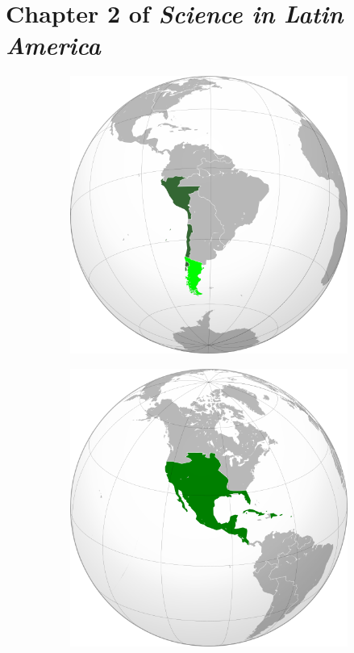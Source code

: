 \documentclass[12pt]{article}
\begin{document}
\maketitle

\section{Chapter 2 of \textit{Science in Latin America}}

\begin{figure}[ht]
\centering
\begin{subfigure}{0.15\textwidth}
\includegraphics[width=\textwidth]{vice_peru.png}
\caption{\label{fig:1a}}
\end{subfigure}
\begin{subfigure}{0.15\textwidth}
\includegraphics[width=\textwidth]{vice_nuevaespana.png}

\end{subfigure}
\end{figure}
\end{document}
